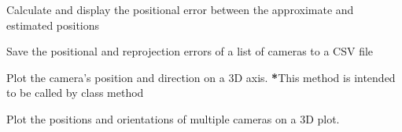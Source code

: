 \documentclass[letterpaper,10pt,english]{sphinxmanual}
\begin{document}
\begin{fulllineitems}
\begin{fulllineitems}
\end{fulllineitems}


\begin{fulllineitems}
\label{\detokenize{CameraUtils:CameraUtils.Camera.PosError}}
\pysigstartsignatures
{}
\pysigstopsignatures
\sphinxAtStartPar
Calculate and display the positional error between the approximate
and estimated positions

\end{fulllineitems}


\begin{fulllineitems}
\label{\detokenize{CameraUtils:CameraUtils.Camera.SaveErrors}}
\pysigstartsignatures
{}
\pysigstopsignatures
\sphinxAtStartPar
{}
Save the positional and re\sphinxhyphen{}projection errors of a list of cameras to a CSV file

\end{fulllineitems}


\begin{fulllineitems}
\label{\detokenize{CameraUtils:CameraUtils.Camera.PlotCamera}}
\pysigstartsignatures
{}
\pysigstopsignatures
\sphinxAtStartPar
Plot the camera’s position and direction on a 3D axis. {\color{red}\bfseries{}*}This method is intended to be called by  class method

\end{fulllineitems}


\begin{fulllineitems}
\label{\detokenize{CameraUtils:CameraUtils.Camera.PlotMultipleCameras}}
\pysigstartsignatures
{}
\pysigstopsignatures
\sphinxAtStartPar
{}
Plot the positions and orientations of multiple cameras on a 3D plot.


\end{fulllineitems}
\end{fulllineitems}
\end{document}
